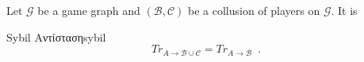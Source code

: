   Let $\mathcal{G}$ be a game graph and $\left(\mathcal{B}, \mathcal{C}\right)$ be a collusion of players on
  $\mathcal{G}$. It is
\begin{theoremgr}{\textlatin{Sybil} Αντίσταση}{sybil} \ \\
  \begin{equation*}
     Tr_{A \rightarrow \mathcal{B} \cup \mathcal{C}} = Tr_{A \rightarrow \mathcal{B}} \enspace.
  \end{equation*}
\end{theoremgr}

